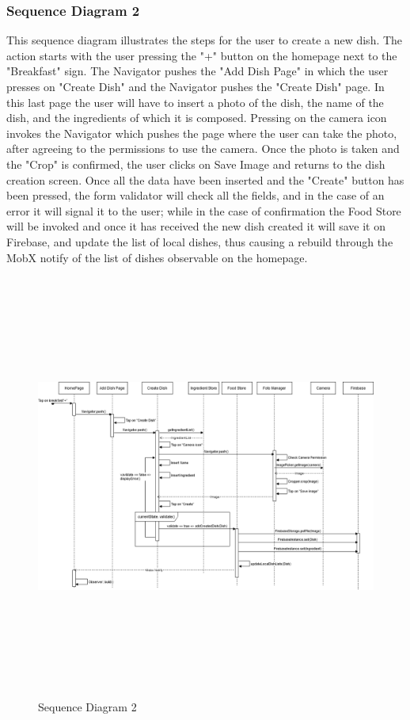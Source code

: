 \documentclass [12pt]{article}
\begin{document}
\subsubsection{Sequence Diagram 2}
This sequence diagram illustrates the steps for the user to create a new dish.
The action starts with the user pressing the "+" button on the homepage next to the "Breakfast" sign. The Navigator pushes the "Add Dish Page" in which the user presses on "Create Dish" and the Navigator pushes the "Create Dish" page.
In this last page the user will have to insert a photo of the dish, the name of the dish, and the ingredients of which it is composed.
Pressing on the camera icon invokes the Navigator which pushes the page where the user can take the photo, after agreeing to the permissions to use the camera. Once the photo is taken and the "Crop" is confirmed, the user clicks on Save Image and returns to the dish creation screen. 
Once all the data have been inserted and the "Create" button has been pressed, the form validator will check all the fields, and in the case of an error it will signal it to the user; while in the case of confirmation the Food Store will be invoked and once it has received the new dish created it will save it on Firebase, and update the list of local dishes, thus causing a rebuild through the MobX notify of the list of dishes observable on the homepage.
\begin{figure}[ht!]
\centering
\includegraphics[height=14cm, width=\linewidth]{SequenceCreateDish.png}
\caption{Sequence Diagram 2}
\end{figure}  
\clearpage
\end{document}
